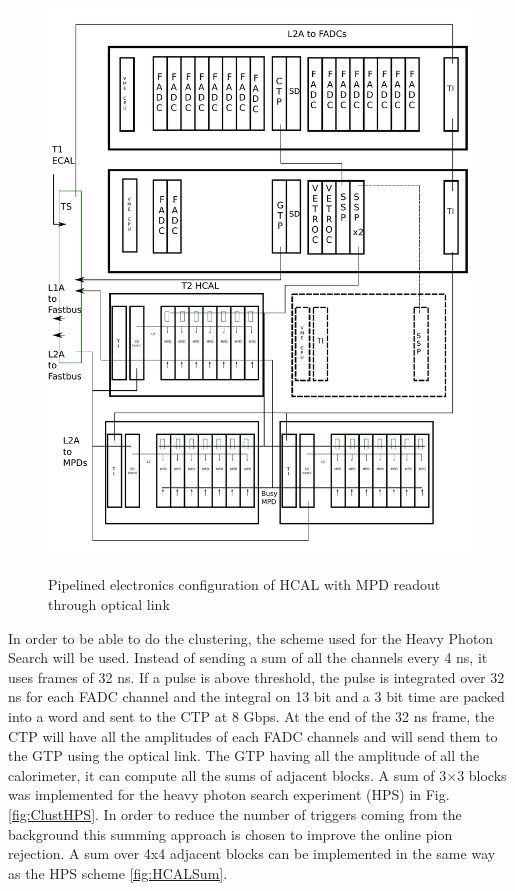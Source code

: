 \documentclass{article}
\begin{document}
\begin{figure}
  \centering
\includegraphics[width=\textwidth]{figs/NewMPDDetailed.pdf}\\
  \caption{Pipelined electronics configuration of HCAL with MPD readout through optical link}\label{fig:pipeline_daq}
\end{figure}

In order to be able to do the clustering, the scheme used for the Heavy Photon Search will be used.
Instead of sending a sum of all the channels every 4 ns, it uses frames of 32 ns. If a pulse is above threshold, the pulse is integrated over 32 ns for each FADC channel and the integral on 13 bit and a 3 bit time are packed into a word and sent to the CTP at 8 Gbps. At the end of the 32 ns frame, the CTP will have all the amplitudes of each FADC channels and will send them to the GTP using the optical link. 
The GTP having all the amplitude of all the calorimeter, it can compute all the sums of adjacent blocks.
A sum of 3$\times$3 blocks was implemented for the heavy photon search experiment (HPS) in Fig.\ref{fig:ClustHPS}.
In order to reduce the number of triggers coming from the background this summing approach is chosen to improve the online pion rejection.
A sum over 4x4 adjacent blocks can be implemented in the same way as the HPS scheme \ref{fig:HCALSum}. 
\end{document}
